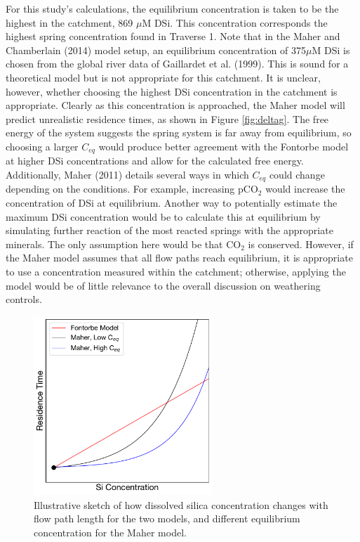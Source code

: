 For this study's calculations, the equilibrium concentration is taken to be the highest in the catchment, 869 $\mu$M DSi. This concentration corresponds the highest spring concentration found in Traverse 1. Note that in the Maher and Chamberlain (2014) model setup, an equilibrium concentration of 375$\mu$M DSi is chosen from the global river data of Gaillardet et al. (1999). This is sound for a theoretical model but is not appropriate for this catchment. It is unclear, however, whether choosing the highest DSi concentration in the catchment is appropriate. Clearly as this concentration is approached, the Maher model will predict unrealistic residence times, as shown in Figure \ref{fig:deltag}. The free energy of the system suggests the spring system is far away from equilibrium, so choosing a larger $C_{eq}$ would produce better agreement with the Fontorbe model at higher DSi concentrations and allow for the calculated free energy. Additionally, Maher (2011) details several ways in which $C_{eq}$ could change depending on the conditions. For example, increasing pCO$_2$ would increase the concentration of DSi at equilibrium. Another way to potentially estimate the maximum DSi concentration would be to calculate this at equilibrium by simulating further reaction of the most reacted springs with the appropriate minerals. The only assumption here would be that CO$_2$ is conserved. However, if the Maher model assumes that all flow paths reach equilibrium, it is appropriate to use a concentration measured within the catchment; otherwise, applying the model would be of little relevance to the overall discussion on weathering controls.

\begin{figure}[h]
    \centering
    \includegraphics[width=0.6\textwidth]{Linear_vs_Exponential_Comparison.pdf}
    \caption{Illustrative sketch of how dissolved silica concentration changes with flow path length for the two models, and different equilibrium concentration for the Maher model.}
    \label{fig:comparisonceq}
\end{figure}

